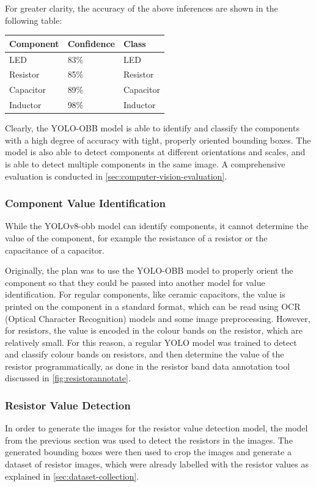 For greater clarity, the accuracy of the above inferences are shown in the following table:
\begin{table}[H]
  \centering
  \begin{tabularx}{0.9\textwidth}{|X|X|X|}
    \hline
    \textbf{Component} & \textbf{Confidence} & \textbf{Class} \\
    \hline
    LED & 83\% & LED \\
    \hline
    Resistor & 85\% & Resistor \\
    \hline
    Capacitor & 89\% & Capacitor \\
    \hline
    Inductor & 98\% & Inductor \\
    \hline
  \end{tabularx}
\end{table}

Clearly, the YOLO-OBB model is able to identify and classify the components with a high degree of accuracy with tight, properly oriented bounding boxes. The model is also able to detect components at different orientations and scales, and is able to detect multiple components in the same image. A comprehensive evaluation is conducted in \autoref{sec:computer-vision-evaluation}.

\subsubsection{Component Value Identification}
\label{sec:component-value-identification}
While the YOLOv8-obb model can identify components, it cannot determine the value of the component, for example the resistance of a resistor or the capacitance of a capacitor. 

Originally, the plan was to use the YOLO-OBB model to properly orient the component so that they could be passed into another model for value identification. For regular components, like ceramic capacitors, the value is printed on the component in a standard format, which can be read using OCR (Optical Character Recognition) models and some image preprocessing. However, for resistors, the value is encoded in the colour bands on the resistor, which are relatively small. For this reason, a regular YOLO model was trained to detect and classify colour bands on resistors, and then determine the value of the resistor programmatically, as done in the resistor band data annotation tool discussed in \autoref{fig:resistorannotate}.

\subsubsection{Resistor Value Detection}
\label{sec:resistor-value-detection}
In order to generate the images for the resistor value detection model, the model from the previous section was used to detect the resistors in the images. The generated bounding boxes were then used to crop the images and generate a dataset of resistor images, which were already labelled with the resistor values as explained in \autoref{sec:dataset-collection}.

